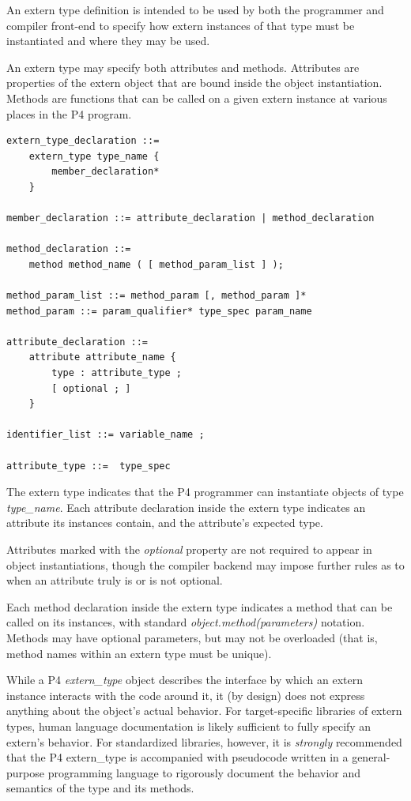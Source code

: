 \documentclass[12pt]{article}
\begin{document}

An extern type definition is intended to be 
used by both the programmer and compiler front-end to specify how extern
instances of that type must be instantiated and where they may be used.

An extern type may specify both attributes and methods. Attributes are
properties of the extern object that are bound inside the object
instantiation. Methods are functions that can be called on a given extern
instance at various places in the P4 program.

\begin{lstlisting}[style=BNFstyle]
extern_type_declaration ::= 
    extern_type type_name {
        member_declaration*
    }

member_declaration ::= attribute_declaration | method_declaration

method_declaration ::= 
    method method_name ( [ method_param_list ] );

method_param_list ::= method_param [, method_param ]*
method_param ::= param_qualifier* type_spec param_name

attribute_declaration ::= 
    attribute attribute_name {
        type : attribute_type ;
        [ optional ; ]
    }

identifier_list ::= variable_name ;

attribute_type ::=  type_spec
\end{lstlisting}

The extern type indicates that the P4 programmer can instantiate objects of
type \textit{type_name}. Each attribute declaration inside the extern type 
indicates an attribute its instances contain, and the attribute's expected type.

Attributes marked with the \textit{optional} property are not required to
appear in object instantiations, though the compiler backend may impose further
rules as to when an attribute truly is or is not optional.

Each method declaration inside the extern type indicates a method that can be
called on its instances, with standard \textit{object.method(parameters)} 
notation. Methods may have optional parameters, but may not be overloaded (that
is, method names within an extern type must be unique).

While a P4 \textit{extern_type} object describes the interface by which an
extern instance interacts with the code around it, it (by design) does not
express anything about the object's actual behavior. For target-specific
libraries of extern types, human language documentation is likely sufficient 
to fully specify an extern's behavior. For standardized libraries, however,
it is \textit{strongly} recommended that the P4 extern_type is accompanied
with pseudocode written in a general-purpose programming language to rigorously 
document the behavior and semantics of the type and its methods.
\end{document}
